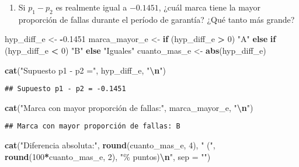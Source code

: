 \documentclass[
]{article}
\newenvironment{Shaded}{\begin{snugshade}}{\end{snugshade}}
\newcommand{\AttributeTok}[1]{\textcolor[rgb]{0.13,0.29,0.53}{#1}}
\newcommand{\ControlFlowTok}[1]{\textcolor[rgb]{0.13,0.29,0.53}{\textbf{#1}}}
\newcommand{\DecValTok}[1]{\textcolor[rgb]{0.00,0.00,0.81}{#1}}
\newcommand{\FloatTok}[1]{\textcolor[rgb]{0.00,0.00,0.81}{#1}}
\newcommand{\FunctionTok}[1]{\textcolor[rgb]{0.13,0.29,0.53}{\textbf{#1}}}
\newcommand{\NormalTok}[1]{#1}
\newcommand{\OtherTok}[1]{\textcolor[rgb]{0.56,0.35,0.01}{#1}}
\newcommand{\SpecialCharTok}[1]{\textcolor[rgb]{0.81,0.36,0.00}{\textbf{#1}}}
\newcommand{\StringTok}[1]{\textcolor[rgb]{0.31,0.60,0.02}{#1}}
\providecommand{\tightlist}{%
  \setlength{\itemsep}{0pt}\setlength{\parskip}{0pt}}
\begin{document}
\begin{enumerate}
\def\labelenumi{\alph{enumi})}
\setcounter{enumi}{4}
\tightlist
\item
  Si \(p_1 - p_2\) es realmente igual a \(-0.1451\), ¿cuál marca tiene
  la mayor proporción de fallas durante el período de garantía? ¿Qué
  tanto más grande?
\end{enumerate}

\begin{Shaded}
\begin{Highlighting}[]
\NormalTok{hyp\_diff\_e }\OtherTok{\textless{}{-}} \SpecialCharTok{{-}}\FloatTok{0.1451}
\NormalTok{marca\_mayor\_e }\OtherTok{\textless{}{-}} \ControlFlowTok{if}\NormalTok{ (hyp\_diff\_e }\SpecialCharTok{\textgreater{}} \DecValTok{0}\NormalTok{) }\StringTok{"A"} \ControlFlowTok{else} \ControlFlowTok{if}\NormalTok{ (hyp\_diff\_e }\SpecialCharTok{\textless{}} \DecValTok{0}\NormalTok{) }\StringTok{"B"} \ControlFlowTok{else} \StringTok{"Iguales"}
\NormalTok{cuanto\_mas\_e }\OtherTok{\textless{}{-}} \FunctionTok{abs}\NormalTok{(hyp\_diff\_e)}

\FunctionTok{cat}\NormalTok{(}\StringTok{"Supuesto p1 {-} p2 ="}\NormalTok{, hyp\_diff\_e, }\StringTok{"}\SpecialCharTok{\textbackslash{}n}\StringTok{"}\NormalTok{)}
\end{Highlighting}
\end{Shaded}

\begin{verbatim}
## Supuesto p1 - p2 = -0.1451
\end{verbatim}

\begin{Shaded}
\begin{Highlighting}[]
\FunctionTok{cat}\NormalTok{(}\StringTok{"Marca con mayor proporción de fallas:"}\NormalTok{, marca\_mayor\_e, }\StringTok{"}\SpecialCharTok{\textbackslash{}n}\StringTok{"}\NormalTok{)}
\end{Highlighting}
\end{Shaded}

\begin{verbatim}
## Marca con mayor proporción de fallas: B
\end{verbatim}

\begin{Shaded}
\begin{Highlighting}[]
\FunctionTok{cat}\NormalTok{(}\StringTok{"Diferencia absoluta:"}\NormalTok{, }\FunctionTok{round}\NormalTok{(cuanto\_mas\_e, }\DecValTok{4}\NormalTok{), }\StringTok{" ("}\NormalTok{, }\FunctionTok{round}\NormalTok{(}\DecValTok{100}\SpecialCharTok{*}\NormalTok{cuanto\_mas\_e, }\DecValTok{2}\NormalTok{), }\StringTok{"\% puntos)}\SpecialCharTok{\textbackslash{}n}\StringTok{"}\NormalTok{, }\AttributeTok{sep =} \StringTok{""}\NormalTok{)}
\end{Highlighting}
\end{Shaded}
\end{document}
